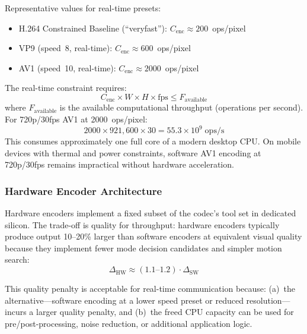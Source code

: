 Representative values for real-time presets:

\begin{itemize}
\item H.264 Constrained Baseline (``veryfast''): $C_{\text{enc}} \approx
  200$~ops/pixel
\item VP9 (speed~8, real-time): $C_{\text{enc}} \approx 600$~ops/pixel
\item AV1 (speed~10, real-time): $C_{\text{enc}} \approx 2000$~ops/pixel
\end{itemize}

The real-time constraint requires:
\begin{equation}
  C_{\text{enc}} \times W \times H \times \text{fps}
    \leq F_{\text{available}}
  \label{eq:realtime-constraint}
\end{equation}
where $F_{\text{available}}$ is the available computational throughput
(operations per second). For 720p/30fps AV1 at 2000~ops/pixel:
\begin{equation}
  2000 \times 921{,}600 \times 30 = 55.3 \times 10^9 \;\text{ops/s}
  \label{eq:av1-cost}
\end{equation}
This consumes approximately one full core of a modern desktop CPU. On
mobile devices with thermal and power constraints, software AV1 encoding
at 720p/30fps remains impractical without hardware acceleration.

\subsubsection{Hardware Encoder Architecture}

Hardware encoders implement a fixed subset of the codec's tool set in
dedicated silicon. The trade-off is quality for throughput: hardware
encoders typically produce output 10--20\% larger than software encoders
at equivalent visual quality because they implement fewer mode decision
candidates and simpler motion search:
\begin{equation}
  \Delta_{\text{HW}} \approx (1.1 \text{--} 1.2)
    \cdot \Delta_{\text{SW}}
  \label{eq:hw-quality-gap}
\end{equation}

This quality penalty is acceptable for real-time communication because:
(a)~the alternative---software encoding at a lower speed preset or reduced
resolution---incurs a larger quality penalty, and (b)~the freed CPU
capacity can be used for pre/post-processing, noise reduction, or
additional application logic.

